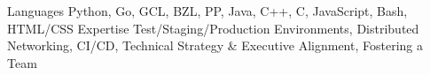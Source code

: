

\begin{cvskills}
    \cvskill
        {Languages}
        {Python, Go, GCL, BZL, PP, Java, C++, C, JavaScript, Bash, HTML/CSS}
    \cvskill
        {Expertise}
        {Test/Staging/Production Environments, Distributed Networking, CI/CD, Technical Strategy \& Executive Alignment, Fostering a Team}

\end{cvskills}
